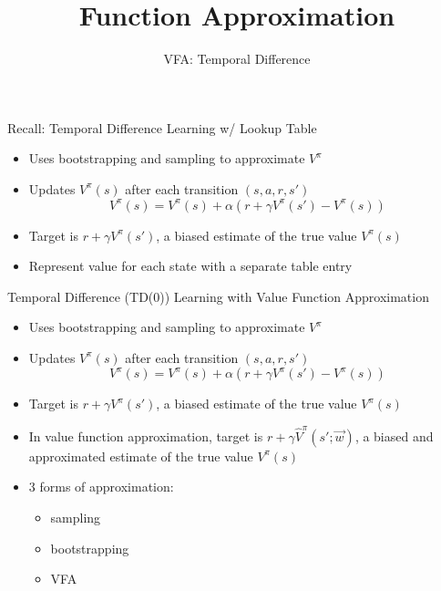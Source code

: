 


\title[Reinforcement Learning: Function Approximation]{Function Approximation}
\subtitle{VFA: Temporal Difference}



	
	\maketitle

\begin{frame}[c]{Recall: Temporal Difference Learning w/ Lookup Table}
	
	\begin{itemize}
		\item Uses bootstrapping and sampling to approximate $V^\pi$
		\item Updates $V^\pi(s)$ after each transition $(s,a,r,s')$
		$$V^\pi(s) = V^\pi (s) + \alpha(r + \gamma V^\pi (s') - V^\pi(s)) $$
		\item Target is $r + \gamma V^\pi(s')$, a biased estimate of the true value $V^\pi(s)$
		\item Represent value for each state with a separate table entry
	\end{itemize}

\end{frame}
\begin{frame}[c]{Temporal Difference (TD(0)) Learning with Value
		Function Approximation}
	
	\begin{itemize}
		\item Uses bootstrapping and sampling to approximate $V^\pi$
		\item Updates $V^\pi(s)$ after each transition $(s,a,r,s')$
		$$V^\pi(s) = V^\pi (s) + \alpha(r + \gamma V^\pi (s') - V^\pi(s)) $$
		\item Target is $r + \gamma V^\pi(s')$, a biased estimate of the true value $V^\pi(s)$
		\item In value function approximation, target is $r + \gamma \hat{V}^\pi (s'; \vec{w})$, a biased and approximated estimate of the true value $V^\pi(s)$
		\item 3 forms of approximation: 
		\begin{itemize}
			\item sampling
			\item bootstrapping
			\item VFA
		\end{itemize}
	\end{itemize}
	
\end{frame}
